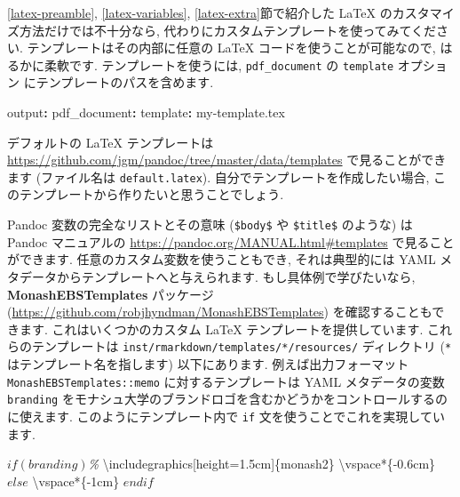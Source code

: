 \documentclass[
  11pt,
]{bxjsreport}
\newenvironment{Shaded}{\begin{snugshade}}{\end{snugshade}}
\newcommand{\AttributeTok}[1]{\textcolor[rgb]{0.77,0.63,0.00}{#1}}
\newcommand{\BuiltInTok}[1]{#1}
\newcommand{\CommentTok}[1]{\textcolor[rgb]{0.56,0.35,0.01}{\textit{#1}}}
\newcommand{\ExtensionTok}[1]{#1}
\newcommand{\FunctionTok}[1]{\textcolor[rgb]{0.00,0.00,0.00}{#1}}
\newcommand{\KeywordTok}[1]{\textcolor[rgb]{0.13,0.29,0.53}{\textbf{#1}}}
\newcommand{\NormalTok}[1]{#1}
\newcommand{\SpecialStringTok}[1]{\textcolor[rgb]{0.31,0.60,0.02}{#1}}
\begin{document}
\ref{latex-preamble}, \ref{latex-variables}, \ref{latex-extra}節で紹介した LaTeX のカスタマイズ方法だけでは不十分なら, 代わりにカスタムテンプレートを使ってみてください. テンプレートはその内部に任意の LaTeX コードを使うことが可能なので, はるかに柔軟です. テンプレートを使うには, \texttt{pdf\_document} の \texttt{template} オプション にテンプレートのパスを含めます.

\begin{Shaded}
\begin{Highlighting}[]
\FunctionTok{output}\KeywordTok{:}
\AttributeTok{  }\FunctionTok{pdf\_document}\KeywordTok{:}
\AttributeTok{    }\FunctionTok{template}\KeywordTok{:}\AttributeTok{ my{-}template.tex}
\end{Highlighting}
\end{Shaded}

デフォルトの LaTeX テンプレートは \url{https://github.com/jgm/pandoc/tree/master/data/templates} で見ることができます (ファイル名は \texttt{default.latex}). 自分でテンプレートを作成したい場合, このテンプレートから作りたいと思うことでしょう.

Pandoc 変数の完全なリストとその意味 (\texttt{\$body\$} や \texttt{\$title\$} のような) は Pandoc マニュアルの \url{https://pandoc.org/MANUAL.html\#templates} で見ることができます. 任意のカスタム変数を使うこともでき, それは典型的には YAML メタデータからテンプレートへと与えられます. もし具体例で学びたいなら, \textbf{MonashEBSTemplates} パッケージ (\url{https://github.com/robjhyndman/MonashEBSTemplates}) を確認することもできます. これはいくつかのカスタム LaTeX テンプレートを提供しています. これらのテンプレートは \texttt{inst/rmarkdown/templates/*/resources/} ディレクトリ (\texttt{*} はテンプレート名を指します) 以下にあります. 例えば出力フォーマット \texttt{MonashEBSTemplates::memo} に対するテンプレートは YAML メタデータの変数 \texttt{branding} をモナシュ大学のブランドロゴを含むかどうかをコントロールするのに使えます. このようにテンプレート内で \texttt{if} 文を使うことでこれを実現しています.

\begin{Shaded}
\begin{Highlighting}[]
\SpecialStringTok{$if(branding)$}\CommentTok{\%}
\BuiltInTok{\textbackslash{}includegraphics}\NormalTok{[height=1.5cm]\{}\ExtensionTok{monash2}\NormalTok{\}}
\FunctionTok{\textbackslash{}vspace*}\NormalTok{\{{-}0.6cm\}}
\SpecialStringTok{$else$}
\FunctionTok{\textbackslash{}vspace*}\NormalTok{\{{-}1cm\}}
\SpecialStringTok{$endif$}
\end{Highlighting}
\end{Shaded}
\end{document}
